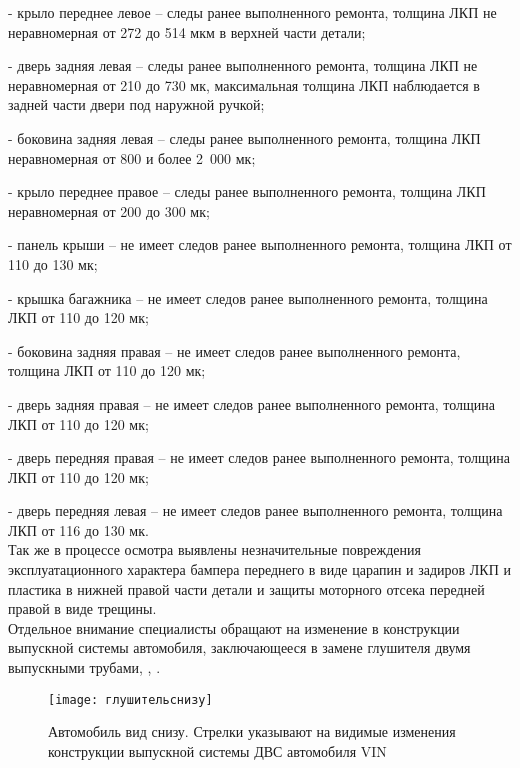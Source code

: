 - крыло переднее левое – следы ранее выполненного ремонта, толщина ЛКП не неравномерная от 272 до 514 мкм в верхней части детали;

- дверь задняя левая – следы ранее выполненного ремонта, толщина ЛКП не неравномерная от 210 до 730 мк, максимальная толщина ЛКП наблюдается в задней части двери под наружной ручкой;

- боковина задняя левая – следы ранее выполненного ремонта, толщина ЛКП  неравномерная от 800  и более 2 000 мк;

- крыло переднее правое – следы ранее выполненного ремонта, толщина ЛКП неравномерная от 200 до 300 мк;

- панель крыши – не имеет следов ранее выполненного ремонта, толщина ЛКП от 110 до 130 мк;

- крышка багажника – не имеет следов ранее выполненного ремонта, толщина ЛКП от 110 до 120 мк;

- боковина задняя правая – не имеет следов ранее выполненного ремонта, толщина ЛКП от 110 до 120 мк;

- дверь задняя правая – не имеет следов ранее выполненного ремонта, толщина ЛКП от 110 до 120 мк;

- дверь передняя правая – не имеет следов ранее выполненного ремонта, толщина ЛКП от 110 до 120 мк;

- дверь передняя левая – не имеет следов ранее выполненного ремонта, толщина ЛКП от 116 до 130 мк.\\

Так же в процессе осмотра выявлены незначительные повреждения эксплуатационного характера бампера переднего в виде царапин и задиров  ЛКП и пластика в нижней правой части детали и защиты моторного отсека передней правой в виде трещины.\\

Отдельное внимание специалисты обращают на изменение в конструкции выпускной системы автомобиля, заключающееся в замене  глушителя двумя выпускными трубами, , .\\


   \begin{figure}[H]
   	\centering
   	\texttt{[image: глушительснизу]}
    \label{constr}
   	\caption{Автомобиль вид снизу. Стрелки указывают на видимые изменения конструкции выпускной системы ДВС автомобиля  VIN \vin}
     \end{figure}
   
